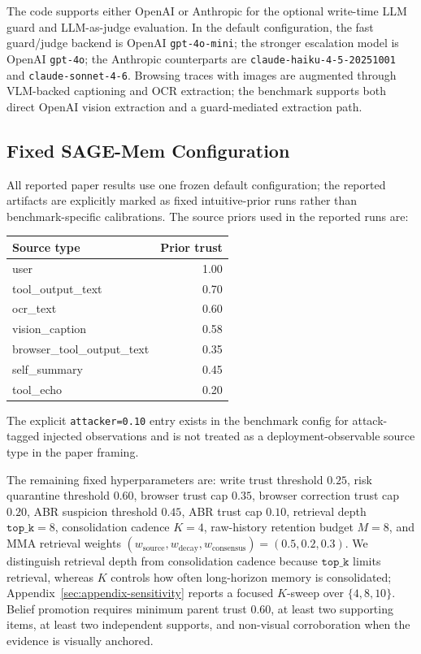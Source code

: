 \documentclass{article}
\begin{document}
The code supports either OpenAI or Anthropic for the optional write-time LLM guard and LLM-as-judge evaluation. In the default configuration, the fast guard/judge backend is OpenAI \texttt{gpt-4o-mini}; the stronger escalation model is OpenAI \texttt{gpt-4o}; the Anthropic counterparts are \texttt{claude-haiku-4-5-20251001} and \texttt{claude-sonnet-4-6}. Browsing traces with images are augmented through VLM-backed captioning and OCR extraction; the benchmark supports both direct OpenAI vision extraction and a guard-mediated extraction path.

\subsection{Fixed SAGE-Mem Configuration}

All reported paper results use one frozen default configuration; the reported artifacts are explicitly marked as fixed intuitive-prior runs rather than benchmark-specific calibrations. The source priors used in the reported runs are:
\begin{center}
\small
\begin{tabular}{lr}
\toprule
Source type & Prior trust \\
\midrule
user & 1.00 \\
tool\_output\_text & 0.70 \\
ocr\_text & 0.60 \\
vision\_caption & 0.58 \\
browser\_tool\_output\_text & 0.35 \\
self\_summary & 0.45 \\
tool\_echo & 0.20 \\
\bottomrule
\end{tabular}
\end{center}
The explicit \texttt{attacker=0.10} entry exists in the benchmark config for attack-tagged injected observations and is not treated as a deployment-observable source type in the paper framing.

The remaining fixed hyperparameters are: write trust threshold \(0.25\), risk quarantine threshold \(0.60\), browser trust cap \(0.35\), browser correction trust cap \(0.20\), ABR suspicion threshold \(0.45\), ABR trust cap \(0.10\), retrieval depth \(\texttt{top\_k}=8\), consolidation cadence \(K=4\), raw-history retention budget \(M=8\), and MMA retrieval weights \((w_{\text{source}}, w_{\text{decay}}, w_{\text{consensus}})=(0.5,0.2,0.3)\). We distinguish retrieval depth from consolidation cadence because \(\texttt{top\_k}\) limits retrieval, whereas \(K\) controls how often long-horizon memory is consolidated; Appendix~\ref{sec:appendix-sensitivity} reports a focused \(K\)-sweep over \(\{4,8,10\}\). Belief promotion requires minimum parent trust \(0.60\), at least two supporting items, at least two independent supports, and non-visual corroboration when the evidence is visually anchored.
\end{document}
